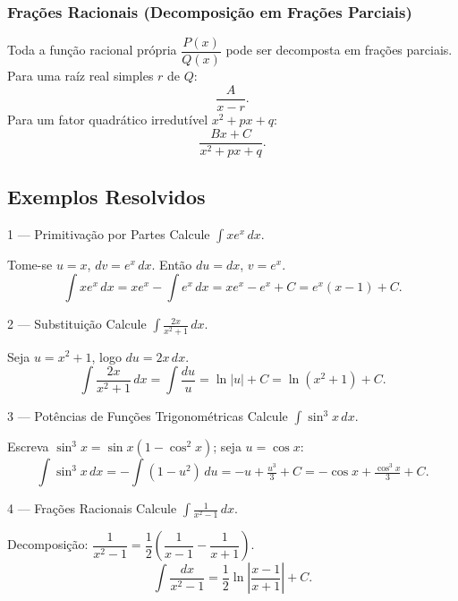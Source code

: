 \subsubsection*{Frações Racionais (Decomposição em Frações Parciais)}

Toda a função racional própria $\dfrac{P(x)}{Q(x)}$ pode ser decomposta em
frações parciais. Para uma raíz real simples $r$ de $Q$:
\[
  \frac{A}{x-r}.
\]
Para um fator quadrático irredutível $x^2+px+q$:
\[
  \frac{Bx+C}{x^2+px+q}.
\]

\subsection{Exemplos Resolvidos}

\begin{exbox}{1 --- Primitivação por Partes}
  Calcule $\displaystyle\int x e^x\,dx$.
\end{exbox}
\begin{solbox}
  Tome-se $u=x$, $dv=e^x\,dx$. Então $du=dx$, $v=e^x$.
  \[
    \int x e^x\,dx = xe^x - \int e^x\,dx = xe^x - e^x + C = e^x(x-1)+C.
  \]
\end{solbox}

\begin{exbox}{2 --- Substituição}
  Calcule $\displaystyle\int \frac{2x}{x^2+1}\,dx$.
\end{exbox}
\begin{solbox}
  Seja $u = x^2+1$, logo $du = 2x\,dx$.
  \[
    \int \frac{2x}{x^2+1}\,dx = \int \frac{du}{u} = \ln|u|+C = \ln(x^2+1)+C.
  \]
\end{solbox}

\begin{exbox}{3 --- Potências de Funções Trigonométricas}
  Calcule $\displaystyle\int \sin^3 x\,dx$.
\end{exbox}
\begin{solbox}
  Escreva $\sin^3 x = \sin x(1-\cos^2 x)$; seja $u=\cos x$:
  \[
    \int \sin^3 x\,dx = -\int (1-u^2)\,du = -u + \tfrac{u^3}{3}+C
      = -\cos x + \tfrac{\cos^3 x}{3}+C.
  \]
\end{solbox}

\begin{exbox}{4 --- Frações Racionais}
  Calcule $\displaystyle\int \frac{1}{x^2-1}\,dx$.
\end{exbox}
\begin{solbox}
  Decomposição: $\dfrac{1}{x^2-1}=\dfrac{1}{2}\!\left(\dfrac{1}{x-1}-\dfrac{1}{x+1}\right)$.
  \[
    \int \frac{dx}{x^2-1} = \frac{1}{2}\ln\left|\frac{x-1}{x+1}\right|+C.
  \]
\end{solbox}
